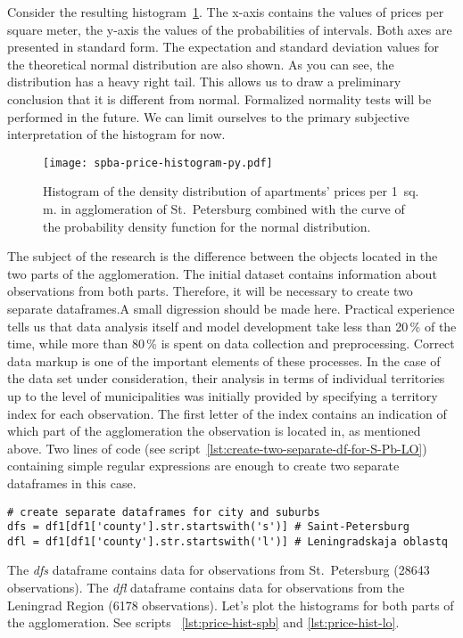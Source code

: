 \documentclass[]{scrreprt}
\begin{document}
Consider the resulting histogram~\ref{fig:spba-prices-hist}. The x-axis contains the values of prices per square meter, the y-axis the values of the probabilities of intervals. Both axes are presented in standard form. The expectation and standard deviation values for the theoretical normal distribution are also shown. As you can see, the distribution has a heavy right tail. This allows us to draw a preliminary conclusion that it is different from normal. Formalized normality tests will be performed in the future. We can limit ourselves to the primary subjective interpretation of the histogram for now.
%
\begin{figure}[htp]
	\centering
	\texttt{[image: spba-price-histogram-py.pdf]}
	\caption{Histogram of the density distribution of apartments' prices per 1~sq.\,m. in agglomeration of  St.~Petersburg combined with the curve of the probability density function for the normal distribution.}
	\label{fig:spba-prices-hist}
\end{figure}
%
The subject of the research is the difference between the objects located in the two parts of the agglomeration. The initial dataset contains information about observations from both parts. Therefore, it will be necessary to create two separate dataframes.A small digression should be made here. Practical experience tells us that data analysis itself and model development take less than 20\,\% of the time, while more than 80\,\% is spent on data collection and preprocessing. Correct data markup is one of the important elements of these processes. In the case of the data set under consideration, their analysis in terms of individual territories up to the level of municipalities was initially provided by specifying a territory index for each observation. The first letter of the index contains an indication of which part of the agglomeration the observation is located in, as mentioned above. Two lines of code (see script~\ref{lst:create-two-separate-df-for-S-Pb-LO}) containing simple regular expressions are enough to create two separate dataframes in this case.
%
\begin{lstlisting}[float=htp, caption = Creating separate dataframes for St.~Petersburg and the Leningrad Region., firstnumber=1, label= lst:create-two-separate-df-for-S-Pb-LO]
# create separate dataframes for city and suburbs
dfs = df1[df1['county'].str.startswith('s')] # Saint-Petersburg
dfl = df1[df1['county'].str.startswith('l')] # Leningradskaja oblastq
\end{lstlisting}
%
The \emph{dfs} dataframe contains data for observations from St.~Petersburg (28643 observations). The \emph{dfl} dataframe contains data for observations from the Leningrad Region (6178 observations). Let's plot the histograms for both parts of the agglomeration. See scripts ~\ref{lst:price-hist-spb} and \ref{lst:price-hist-lo}.
\end{document}
